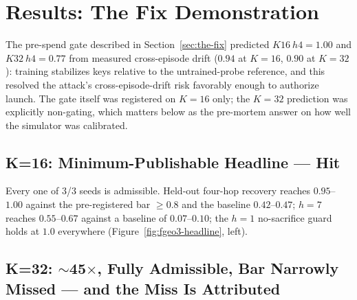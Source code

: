 \section{Results: The Fix Demonstration}
\label{sec:results}


The pre-spend gate described in Section~\ref{sec:the-fix} predicted
$K16\ h4{=}1.00$ and $K32\ h4{=}0.77$ from measured cross-episode drift
($0.94$ at $K{=}16$, $0.90$ at $K{=}32$): training stabilizes keys
relative to the untrained-probe reference, and this resolved the attack's
cross-episode-drift risk favorably enough to authorize launch. The gate
itself was registered on $K{=}16$ only; the $K{=}32$ prediction was
explicitly non-gating, which matters below as the pre-mortem answer on
how well the simulator was calibrated.

\subsection{K=16: Minimum-Publishable Headline --- Hit}

Every one of 3/3 seeds is admissible. Held-out four-hop recovery reaches
$0.95$--$1.00$ against the pre-registered bar $\geq0.8$ and the baseline
$0.42$--$0.47$; $h{=}7$ reaches $0.55$--$0.67$ against a baseline of
$0.07$--$0.10$; the $h{=}1$ no-sacrifice guard holds at $1.0$ everywhere
(Figure~\ref{fig:fgeo3-headline}, left).

\subsection{K=32: \texorpdfstring{$\sim$45$\times$}{~45x}, Fully
Admissible, Bar Narrowly Missed --- and the Miss Is Attributed}

